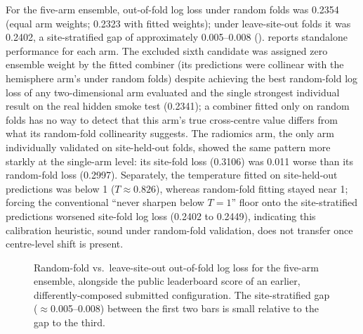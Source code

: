 \documentclass[11pt]{article}
\begin{document}
For the five-arm ensemble, out-of-fold log loss under random folds was 0.2354 (equal arm weights; 0.2323 with fitted weights); under leave-site-out folds it was 0.2402, a site-stratified gap of approximately 0.005--0.008 ().  reports standalone performance for each arm. The excluded sixth candidate was assigned zero ensemble weight by the fitted combiner (its predictions were collinear with the hemisphere arm's under random folds) despite achieving the best random-fold log loss of any two-dimensional arm evaluated and the single strongest individual result on the real hidden smoke test (0.2341); a combiner fitted only on random folds has no way to detect that this arm's true cross-centre value differs from what its random-fold collinearity suggests. The radiomics arm, the only arm individually validated on site-held-out folds, showed the same pattern more starkly at the single-arm level: its site-fold loss (0.3106) was 0.011 worse than its random-fold loss (0.2997). Separately, the temperature fitted on site-held-out predictions was below 1 ($T \approx 0.826$), whereas random-fold fitting stayed near 1; forcing the conventional ``never sharpen below $T=1$'' floor onto the site-stratified predictions worsened site-fold log loss (0.2402 to 0.2449), indicating this calibration heuristic, sound under random-fold validation, does not transfer once centre-level shift is present.

\begin{figure}[h]
\centering
{}
\caption{Random-fold vs.\ leave-site-out out-of-fold log loss for the five-arm ensemble, alongside the public leaderboard score of an earlier, differently-composed submitted configuration. The site-stratified gap ($\approx$0.005--0.008) between the first two bars is small relative to the gap to the third.}
\label{fig:shiftgap}
\end{figure}
\end{document}
